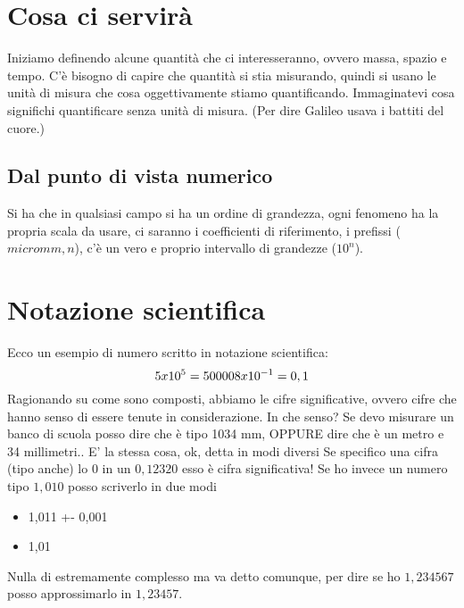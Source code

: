 \documentclass[12pt, a4paper, openany, twoside]{book}
\begin{document}
\section{Cosa ci servirà}
Iniziamo definendo alcune quantità che ci interesseranno, ovvero massa, spazio 
e tempo.
\newline \newline
C'è bisogno di capire che quantità si stia misurando, quindi si usano le unità 
di misura che cosa oggettivamente stiamo quantificando. Immaginatevi cosa 
significhi quantificare senza unità di misura. (Per dire Galileo usava i 
battiti del cuore.)
\newline \newline
\subsection{Dal punto di vista numerico}
Si ha che in qualsiasi campo si ha un ordine di grandezza, ogni fenomeno ha la
propria scala da usare, ci saranno i coefficienti di riferimento, i prefissi
($micro mm, n$), c'è un vero e proprio intervallo di grandezze ($10^{n}$).
\section{Notazione scientifica}
Ecco un esempio di numero scritto in notazione scientifica: 
\[
	5 x 10^{5} = 50000 \newline
	8 x 10^{-1} = 0,1 
\]
\newline \newline
Ragionando su come sono composti, abbiamo le cifre significative, ovvero cifre
che hanno senso di essere tenute in considerazione. In che senso? Se devo 
misurare un banco di scuola posso dire che è tipo 1034 mm, OPPURE dire che è un
metro e 34 millimetri.. E' la stessa cosa, ok, detta in modi diversi
\newline \newline
Se specifico una cifra (tipo anche) lo 0 in un $0,12320$ esso è cifra significativa!
\newline \newline
Se ho invece un numero tipo $1,010$ posso scriverlo in due modi
\begin{itemize}
	\item 1,011 +- 0,001
	\item 1,01 
\end{itemize}
Nulla di estremamente complesso ma va detto comunque, per dire se ho $1,234567$
posso approssimarlo in $1,23457$. \newline \newline
\end{document}
